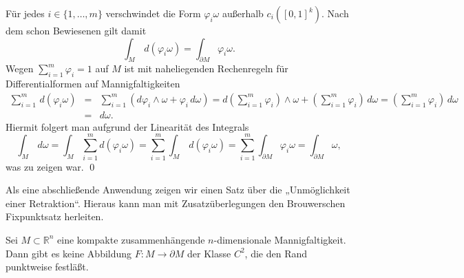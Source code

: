 \documentclass[a4paper,twoside,DIV15,BCOR12mm]{scrbook}
\begin{document}
\noindent
Für jedes $i \in \{1,\dots,m\}$ verschwindet die Form 
$\varphi_{i}\omega$ außerhalb $c_{i}([0,1]^{k})$. Nach dem schon 
Bewiesenen gilt damit
\[ \int_{M} \, d(\varphi_{i}\omega) = \int_{\partial M} 
\varphi_{i}\omega. \]
Wegen $\sum_{i=1}^{m} \varphi_{i} = 1$ auf $M$ ist mit naheliegenden 
Rechenregeln für Differentialformen auf Mannigfaltigkeiten
\begin{eqnarray*}
\sum_{i=1}^{m}\, d(\varphi_{i}\omega) & = & 
\sum_{i=1}^{m}(d\varphi_{i} \wedge \omega + \varphi_{i}\, d\omega) 
 =  d \left(\sum_{i=1}^{m} \varphi_{i}\right) \wedge \omega + 
\left(\sum_{i=1}^{m} \varphi_{i}\right)\, d\omega 
 =  \left(\sum_{i=1}^{m} \varphi_{i}\right) \, d\omega \\
&=& d\omega.
\end{eqnarray*}
Hiermit folgert man aufgrund der Linearität des Integrals
\[
\int_{M} \, d\omega  =  \int_{M}\sum_{i=1}^{m} d(\varphi_{i} 
\omega) = \sum_{i=1}^{m} \int_{M}\, d(\varphi_{i}\omega) 
=  \sum_{i=1}^{m} \int_{\partial M} \varphi_{i}\omega = 
\int_{\partial M} \omega, 
\]
was zu zeigen war. \qed\\

\bigskip

\noindent
Als eine abschließende Anwendung zeigen wir einen Satz über die 
„Unmöglichkeit einer Retraktion“. Hieraus kann man mit 
Zusatzüberlegungen den Brouwerschen Fixpunktsatz herleiten.

\bigskip

\begin{satz}\label{Satz3.7.4} {Sei $M \subset {\mathbb R}^{n}$ eine 
kompakte zusammenhängende $n$-dimensionale Mannigfaltigkeit. Dann 
gibt es keine Abbildung $F: M \to \partial M$ der Klasse $C^{2}$, die 
den Rand punktweise festläßt.}
\end{satz}

\bigskip
\end{document}
